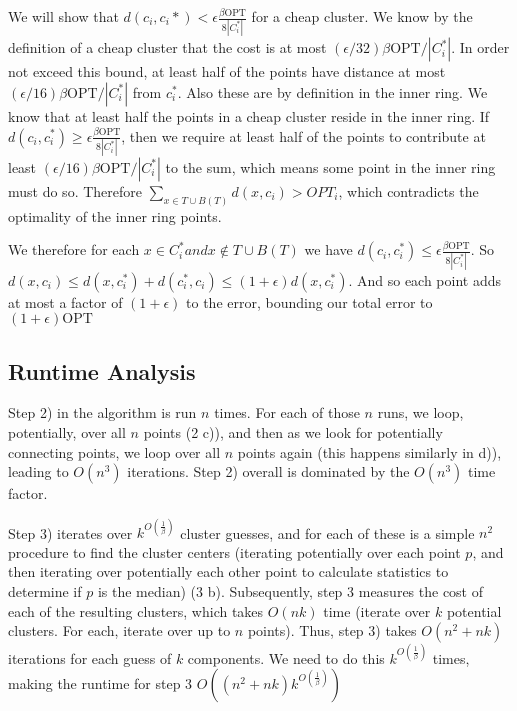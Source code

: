 \documentclass[paper=a4, fontsize=10.5pt]{scrartcl} %
\numberwithin{equation}{section} %
\numberwithin{figure}{section} %
\numberwithin{table}{section} %
\begin{document}
We will show that $d(c_i, c_i*) < \epsilon\frac{\beta\text{OPT}}{8|C_i^*|}$ for a cheap cluster. We know by the definition of a cheap cluster that the cost is at most $(\epsilon/32)\beta\text{OPT}/|C_i^*|$. In order not exceed this bound, at least half of the points have distance at most $(\epsilon/16)\beta\text{OPT}/|C_i^*|$ from $c_i^*$. Also these are by definition in the inner ring. We know that at least half the points in a cheap cluster reside in the inner ring. If $d(c_i, c_i^*)  \geq \epsilon\frac{\beta\text{OPT}}{8|C_i^*|}$, then we require at least half of the points to contribute at least $(\epsilon/16)\beta\text{OPT}/|C_i^*|$ to the sum, which means some point in the inner ring must do so. Therefore $\sum\limits_{x\in T\cup B(T)}d(x, c_i)> OPT_i$, which contradicts the optimality of the inner ring points. 

We therefore for each $x \in C_i^* and x\notin T\cup B(T)$ we have $d(c_i, c_i^*) \leq \epsilon\frac{\beta\text{OPT}}{8|C_i^*|}$. So $d(x, c_i) \leq d(x, c_i^*) + d(c_i^*, c_i) \leq (1+\epsilon)d(x,c_i^*)$. And so each point adds at most a factor of $(1+\epsilon)$ to the error, bounding our total error to $(1+\epsilon)\text{OPT}$





\subsection{Runtime Analysis}

Step 2) in the algorithm is run $n$ times.  For each of those $n$ runs, we loop, potentially, over all $n$  points (2 c)), and then as we look for potentially connecting points, we loop over all $n$  points again (this happens similarly in d)), leading to $O(n^3)$ iterations.  Step 2) overall is dominated by the $O(n^3)$ time factor.

Step 3) iterates over $k^{O(\frac{1}{\beta})}$ cluster guesses, and for each of these is a simple $n^2$ procedure to find the cluster centers (iterating potentially over each point $p$, and then iterating over potentially each other point to calculate statistics to determine if $p$ is the median)  (3 b).  Subsequently, step 3 measures the cost of each of the resulting clusters, which takes $O(nk)$ time (iterate over $k$ potential clusters.  For each, iterate over up to $n$ points).  Thus, step 3) takes $O(n^2 + nk)$ iterations for each guess of $k$ components.  We need to do this $k^{O(\frac{1}{\beta})}$ times, making the runtime for step 3 $O((n^2 + nk)k^{O(\frac{1}{\beta})})$
\end{document}
